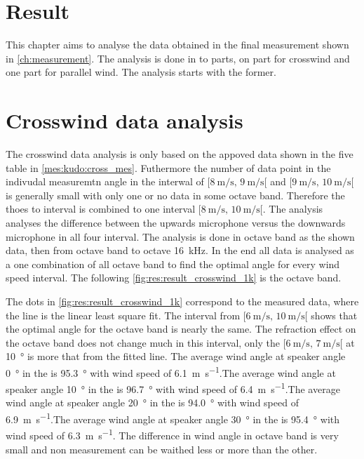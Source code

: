 \section{Result}
This chapter aims to analyse the data obtained in the final measurement shown in \autoref{ch:measurement}. The analysis is done in to parts, on part for crosswind and one part for parallel wind. The analysis starts with the former. 



\section{Crosswind data analysis}\label{res:cross_data_ana}
The crosswind data analysis is only based on the appoved data shown in the five table in \autoref{mes:kudo:cross_mes}. Futhermore the number of data point in the indivudal measuremtn angle in the interwal of $[\SI{8}{\meter\per\second},\, \SI{9}{\meter\per\second}[ $ and $[\SI{9}{\meter\per\second},\, \SI{10}{\meter\per\second}[ $ is generally small with only one or no data in some octave band. Therefore the thoes to interval is combined to one interval $[\SI{8}{\meter\per\second},\, \SI{10}{\meter\per\second}[ $. The analysis analyses the difference between the upwards microphone versus the downwards microphone in all four interval. The analysis is done in octave band as the shown data, then from octave band  to octave \SI{16}{\kilo\hertz}. In the end all data is analysed as a one combination of all octave band to find the optimal angle for every wind speed interval. The following \autoref{fig:res:result_crosswind_1k}  is the  octave band. 


 
 The dots in \autoref{fig:res:result_crosswind_1k} correspond to the measured data, where the line is the linear least square fit. The interval from $[\SI{6}{\meter\per\second},\, \SI{10}{\meter\per\second}[ $ shows that the optimal angle for the  octave band is nearly the same. The refraction effect on the   octave band does not change much in this interval, only the $[\SI{6}{\meter\per\second},\, \SI{7}{\meter\per\second}[ $ at \SI{10}{\degree} is more that  from the fitted line. The average wind angle at speaker angle \SI{0}{\degree} in the  is \SI{95.3}{\degree} with wind speed of \SI{6.1}{\meter\per\second}.The average wind angle at speaker angle \SI{10}{\degree} in the  is \SI{96.7}{\degree} with wind speed of \SI{6.4}{\meter\per\second}.The average wind angle at speaker angle \SI{20}{\degree} in the  is \SI{94.0}{\degree} with wind speed of \SI{6.9}{\meter\per\second}.The average wind angle at speaker angle \SI{30}{\degree} in the  is \SI{95.4}{\degree} with wind speed of \SI{6.3}{\meter\per\second}. The difference in wind angle in   octave band is very small and non measurement can be waithed less or more than the other. 

